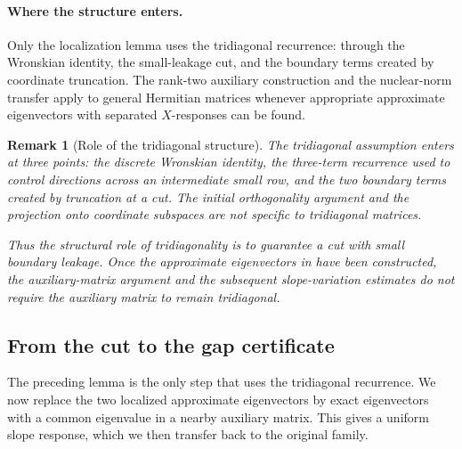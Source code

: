 \documentclass[10pt,a4paper]{article}
\newtheorem{remark}{Remark}[section]
\begin{document}
\paragraph{Where the structure enters.}
Only the localization lemma uses the tridiagonal recurrence:
through the Wronskian identity, the small-leakage cut, and the
boundary terms created by coordinate truncation. The rank-two
auxiliary construction and the nuclear-norm transfer apply to
general Hermitian matrices whenever appropriate approximate
eigenvectors with separated $X$-responses can be found.

\begin{remark}[Role of the tridiagonal structure]
\label{rem:tridiagonal-localization}
The tridiagonal assumption enters at three points:
the discrete Wronskian identity, the three-term
recurrence used to control directions across an
intermediate small row, and the two boundary terms
created by truncation at a cut. The initial
orthogonality argument and the projection onto
coordinate subspaces are not specific to
tridiagonal matrices.

Thus the structural role of tridiagonality is
to guarantee a cut with small boundary leakage.
Once the approximate eigenvectors in
 have been constructed,
the auxiliary-matrix argument and the subsequent
slope-variation estimates do not require the
auxiliary matrix to remain tridiagonal.
\end{remark}

\subsection{From the cut to the gap certificate}
\label{subsec:gap-transfer}

The preceding lemma is the only step that uses the tridiagonal
recurrence. We now replace the two localized approximate eigenvectors
by exact eigenvectors with a common eigenvalue in a nearby auxiliary
matrix. This gives a uniform slope response, which we then transfer
back to the original family.
\end{document}
